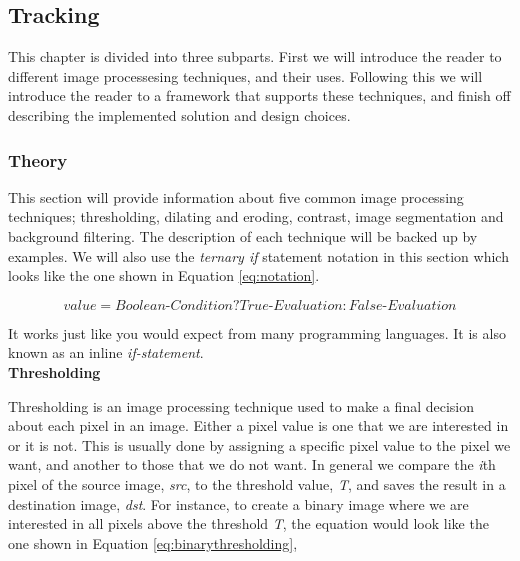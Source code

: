 
\subsection{Tracking}
This chapter is divided into three subparts. First we will introduce the reader to different image processesing techniques, and their uses. Following this we will introduce the reader to a framework that supports these techniques, and finish off describing the implemented solution and design choices.

% 
% 

\subsubsection{Theory}
This section will provide information about five common image processing techniques; thresholding, dilating and eroding, contrast, image segmentation and background filtering. The description of each technique will be backed up by examples. We will also use the \textit{ternary if} statement notation in this section which looks like the one shown in Equation \ref{eq:notation}.

\begin{equation}
value = {Boolean\mbox{-}Condition} ? {True\mbox{-}Evaluation}: {False\mbox{-}Evaluation}
\label{eq:notation}
\end{equation}

It works just like you would expect from many programming languages. It is also known as an inline \textit{if-statement}. \\

\noindent \textbf{Thresholding} \par
Thresholding is an image processing technique used to make a final decision about each pixel in an image. Either a pixel value is one that we are interested in or it is not. This is usually done by assigning a specific pixel value to the pixel we want, and another to those that we do not want. In general we compare the \textit{i}th pixel of the source image, \textit{src}, to the threshold value, \textit{T}, and saves the result in a destination image, \textit{dst}. For instance, to create a binary image where we are interested in all pixels above the threshold \textit{T}, the equation would look like the one shown in Equation \ref{eq:binarythresholding},

